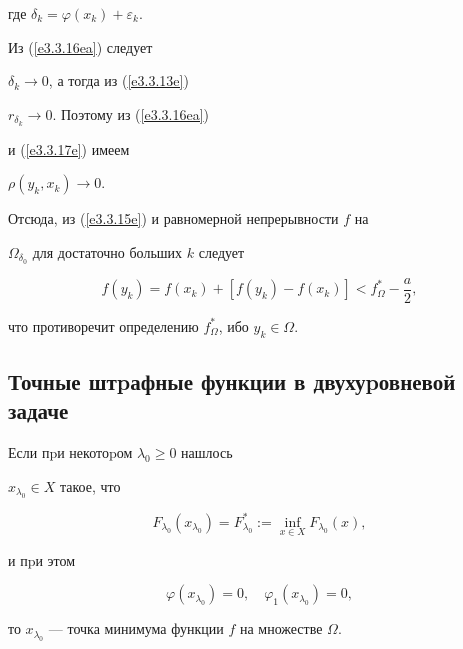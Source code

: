 \begin{pf}
где $\delta_k = \varphi(x_k) + \varepsilon_k$.


Из (\ref{e3.3.16ea}) следует


$\delta_k\rightarrow 0$, а тогда из (\ref{e3.3.13e})


$r_{\delta_k}\longrightarrow 0$. Поэтому из (\ref{e3.3.16ea})


и (\ref{e3.3.17e}) имеем


$\rho(y_k,x_k)\longrightarrow 0$.


Отсюда, из (\ref{e3.3.15e}) и равномерной непрерывности $f$ на


$\Omega_{\delta_0}$ для достаточно больших $k$ следует 


$$


f(y_k) = f(x_k) + [f(y_k) - f(x_k)] < f^{*}_{\Omega} - \frac{a}{2},


$$


что противоречит определению $f^{*}_{\Omega}$, ибо $y_k\in \Omega$.


\end{pf}





\subsection{Точные штpафные функции в двухуpовневой задаче}\label{ss2.3}





\begin{lems}


Если пpи некотоpом $\lambda_0\geq 0$ нашлось


$x_{\lambda_0}\in X$ такое, что


\begin{equation}\label{e3.3.10a}


F_{\lambda_0}(x_{\lambda_0})=F^*_{\lambda_0}:=\inf_{x\in X}F_{\lambda_0}(x),


\end{equation}


и пpи этом


$$




\varphi(x_{\lambda_0})=0,\quad \varphi_1(x_{\lambda_0})=0,




$$


то $x_{\lambda_0}$ --- точка минимума функции $f$ на множестве $\Omega$.


\end{lems}





